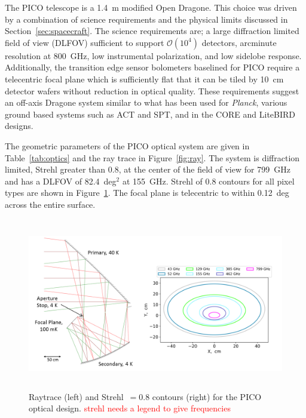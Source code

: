 \documentclass[]{spie}  %
\newcommand{\comr}[1]{\textcolor{red}{#1}}
\begin{document}
The PICO telescope is a 1.4~m modified Open Dragone.  This choice was driven by a combination of science requirements and the physical limits 
discussed in Section~\ref{sec:spacecraft}.  The science requirements are; a large diffraction limited field of view (DLFOV) sufficient to 
support $\mathcal{O}(10^4)$ detectors, arcminute resolution at 800~GHz, low instrumental polarization, and low sidelobe response. Additionally, 
the transition edge sensor bolometers baselined for PICO require a telecentric focal plane which is sufficiently flat that it can be tiled by 
10~cm detector wafers without reduction in optical quality. These requirements suggest an off-axis Dragone system\cite{dragone} similar 
to what has been used for \textit{Planck}\cite{planck2000_optics}, various ground based systems such as ACT\cite{ACT2011_optics} and SPT\cite{SPT2008_optics}, 
and in the CORE\cite{core2018_inst} and LiteBIRD\cite{LB2016_optics} designs.

The geometric parameters of the PICO optical system are given in Table~\ref{tab:optics} and the ray trace in Figure~\ref{fig:ray}. The 
system is diffraction limited, Strehl greater than 0.8, at the center of the field of view for 799~GHz and has a DLFOV of 82.4~deg$^2$ at 
155~GHz.  Strehl of 0.8 contours for all pixel types are shown in Figure~\ref{fig:strehl}. The %
focal plane is telecentric to within 0.12~deg across the entire surface.

\begin{figure} [ht]
\begin{center}
\includegraphics[height=7.5cm]{jpl_ray_strehl.png}
\end{center}
\caption { \label{fig:ray} \label{fig:strehl} 
Raytrace (left) and Strehl~$=0.8$ contours (right) for the PICO optical design. \comr{strehl needs a legend to give frequencies}
}
\end{figure} 
\end{document}
